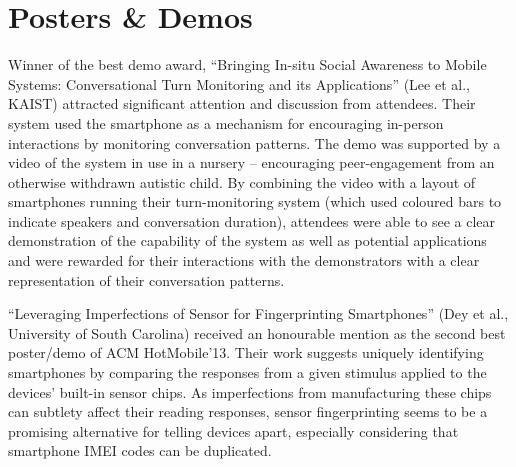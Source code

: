 \section{Posters \& Demos}
\label{sec:postersdemos}
Winner of the best demo award, ``Bringing In-situ Social Awareness to Mobile 
Systems: Conversational Turn Monitoring and its Applications'' (Lee et al., 
KAIST) attracted significant attention and discussion from attendees. Their 
system used the smartphone as a mechanism for encouraging in-person interactions
by monitoring conversation patterns. The demo was supported by a video of the 
system in use in a nursery -- encouraging peer-engagement from an otherwise 
withdrawn autistic child. By combining the video with a layout of smartphones 
running their turn-monitoring system (which used coloured bars to indicate 
speakers and conversation duration), attendees were able to see a clear 
demonstration of the capability of the system as well as potential applications
and were rewarded for their interactions with the demonstrators with a clear
representation of their conversation patterns.

``Leveraging Imperfections of Sensor for Fingerprinting Smartphones''
(Dey et al., University of South Carolina) received an honourable mention
as the second best poster/demo of ACM HotMobile'13. Their work suggests
uniquely identifying smartphones by comparing the responses from a given
stimulus applied to the devices' built-in sensor chips. As imperfections
from manufacturing these chips can subtlety affect their reading
responses, sensor fingerprinting seems to be a promising alternative for
telling devices apart, especially considering that smartphone IMEI codes
can be duplicated.



